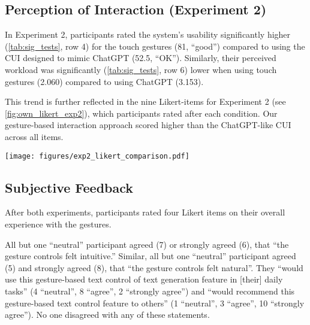 \subsection{Perception of Interaction (Experiment 2)}
\label{sec:perception_exp2}
In Experiment 2, participants rated the system's usability significantly higher (\cref{tab:sig_tests}, row 4) for the touch gestures (81, ``good'') compared to using the CUI designed to mimic ChatGPT (52.5, ``OK'').
Similarly, their perceived workload was significantly (\cref{tab:sig_tests}, row 6) lower when using touch gestures (2.060) compared to using ChatGPT (3.153). %

This trend is further reflected in the nine Likert-items for Experiment 2 (see \cref{fig:own_likert_exp2}), which participants rated after each condition.
Our gesture-based interaction approach scored higher than the ChatGPT-like CUI across all items.

\begin{figure*}
    \centering
    \texttt{[image: figures/exp2\_likert\_comparison.pdf]}
    \caption{Likert results on participants' perception of interaction with our touch-based prototype compared to our CUI implementation, rated after each condition in Experiment 2. Most participants rated almost all items overwhelmingly positive when using our approach.}
    \label{fig:own_likert_exp2}
\end{figure*}


\subsection{Subjective Feedback}
\label{sec:ss_interview_perception}
After both experiments, participants rated four Likert items on their overall experience with the gestures.

All but one ``neutral'' participant agreed (7) or strongly agreed (6), that ``the gesture controls felt intuitive.''
Similar, all but one ``neutral'' participant agreed (5) and strongly agreed (8), that ``the gesture controls felt natural''.
They ``would use this gesture-based text control of text generation feature in [their] daily tasks'' (4 ``neutral'', 8 ``agree'', 2 ``strongly agree'') and ``would recommend this gesture-based text control feature to others'' (1 ``neutral'', 3 ``agree'', 10 ``strongly agree'').
No one disagreed with any of these statements.



